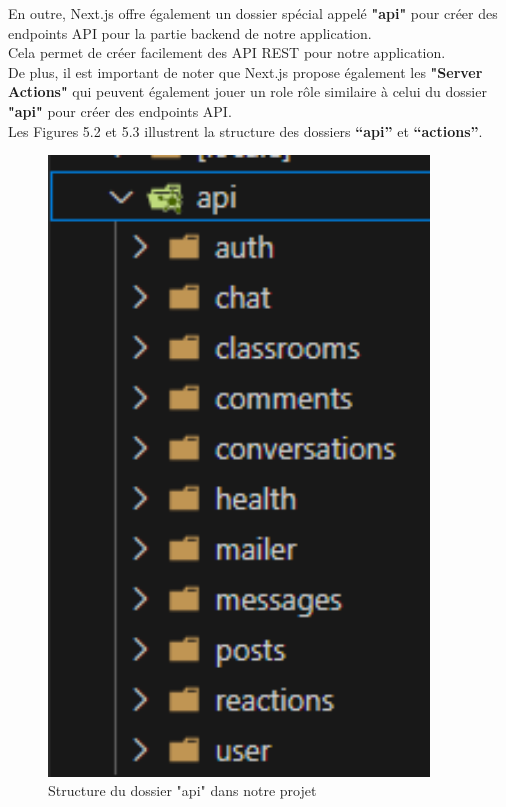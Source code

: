 \noindent En outre, Next.js offre également un dossier spécial appelé \textbf{"api"} pour créer des endpoints API pour la partie backend de notre application.\\
Cela permet de créer facilement des API REST pour notre application.\\
De plus, il est important de noter que Next.js propose également les \textbf{"Server Actions"} qui peuvent également jouer un role rôle similaire à celui du dossier \textbf{"api"} pour créer des endpoints API.\\
Les Figures 5.2 et 5.3 illustrent la structure des dossiers \textbf{“api”} et \textbf{“actions”}.
\begin{figure}[H]
    \centering
    \begin{minipage}[b]{0.45\textwidth}
        \centering
        \includegraphics[width=0.9\textwidth,height=0.9\textwidth]{images/chp5/fig2.png}
        \caption{Structure du dossier "api" dans notre projet}
        \label{fig:Structure du dossier "api" dans notre projet}
    \end{minipage}
    \hspace{0.05\textwidth}
    \begin{minipage}[b]{0.45\textwidth}
        \centering

\end{minipage}
\end{figure}
